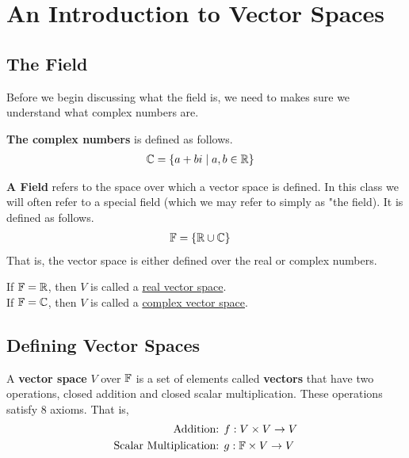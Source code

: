 \section{An Introduction to Vector Spaces}

\subsection{The Field}
Before we begin discussing what the field is, we need to makes sure we understand what complex numbers are.
\begin{definition}
    \textbf{The complex numbers} is defined as follows.
    \begin{align}
        \mathbb{C} &= \{ a + bi \; | \; a,b \in \mathbb{R} \}
    \end{align}
\end{definition}

\begin{definition}
    \textbf{A Field} refers to the space over which a vector space is defined. In this class we will often refer to a special field (which we may refer to
    simply as "the field). It is defined as follows.
    \begin{align}
        \mathbb{F} &= \{ \mathbb{R} \cup \mathbb{C} \}
    \end{align}
    That is, the vector space is either defined over the real or complex numbers.
\end{definition}

\begin{remark}
    If $\mathbb{F} = \mathbb{R}$, then $V$ is called a \underline{real vector space}. \\
    If $\mathbb{F} = \mathbb{C}$, then $V$ is called a \underline{complex vector space}.
\end{remark}

\subsection{Defining Vector Spaces}
\begin{definition}
    A \textbf{vector space} $V$ over $\mathbb{F}$ is a set of elements called \textbf{vectors} that have two operations, closed addition and closed scalar 
    multiplication. These operations satisfy 8 axioms. That is,
    \begin{align*}
        \text{Addition: } & f : V \times V \rightarrow V \\
        \text{Scalar Multiplication: } & g : \mathbb{F} \times V \rightarrow V
    \end{align*}
\end{definition}

